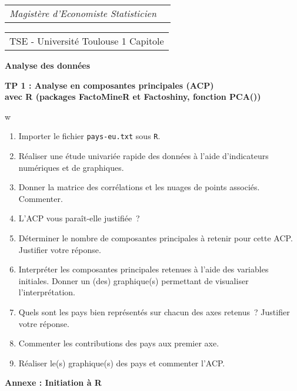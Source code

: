 \documentclass[11pt]{article}
\begin{document}
\vskip -1.5cm


{\begin{tabular}{cc}
\it  Magistère d'Economiste Statisticien\\
\end{tabular}\hfill
{\begin{tabular}{c}
TSE - Université Toulouse 1 Capitole\\
\end{tabular}

\vspace{1cm}

\centerline{\Large\bf  Analyse des données}

\begin{center}
{\Large\bf TP 1 :  Analyse en composantes principales (ACP)  \\  \vspace{0.3cm} avec R  (packages FactoMineR et Factoshiny, fonction PCA())  }
\end{center}

\noindent w
}


\begin{enumerate}
\item Importer le fichier {\tt pays-eu.txt} sous {\tt R}.
\item Réaliser une étude univariée rapide des données à l'aide d'indicateurs numériques et de graphiques.
\item   Donner la matrice des corrélations et les nuages de points associés. Commenter.
\item L'ACP vous paraît-elle justifiée~?
\item Déterminer  le nombre de composantes principales à retenir pour cette ACP. Justifier votre réponse.
\item Interpréter les composantes principales retenues à l'aide des
variables initiales. Donner un (des) graphique(s) permettant de visualiser l'interprétation.
\item Quels sont les pays bien représentés sur chacun des axes retenus~?
Justifier votre réponse.
\item Commenter les contributions des pays aux premier axe.
\item Réaliser le(s) graphique(s) des pays et commenter l'ACP.
\end{enumerate}

\bigskip
{\bf Annexe : Initiation à R }
\bigskip

}
\end{document}
